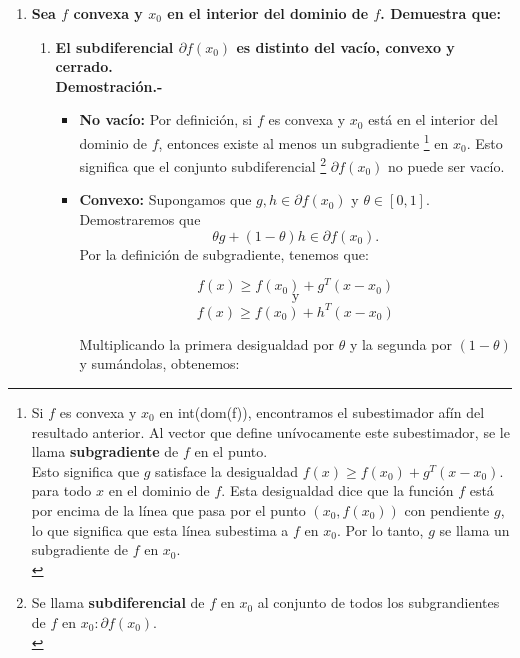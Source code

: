 \begin{enumerate}

    \item \textbf{\boldmath Sea $f$ convexa y $x_0$ en el interior del dominio de $f$. Demuestra que:}
	\begin{enumerate}[\bfseries (a)]
	    \item \textbf{\boldmath El subdiferencial $\partial f(x_0)$ es distinto del vacío, convexo y cerrado.}\\

		\textbf{Demostración.-}\; 

		\begin{itemize}

		    \item \textbf{No vacío:} Por definición, si $f$ es convexa y $x_0$ está en el interior del dominio de $f$, entonces existe al menos un subgradiente
		    \footnote{
			Si $f$ es convexa y $x_0$ en int(dom(f)), encontramos el subestimador afín del resultado anterior. Al vector que define unívocamente este subestimador, se le llama \textbf{subgradiente} de $f$ en el punto.\\
			Esto significa que $g$ satisface la desigualdad $f(x) \geq f(x_0) + g^T (x-x_0).$ para todo $x$ en el dominio de $f$. Esta desigualdad dice que la función $f$ está por encima de la línea que pasa por el punto $(x_0, f(x_0))$ con pendiente $g$, lo que significa que esta línea subestima a $f$ en $x_0$. Por lo tanto, $g$ se llama un subgradiente de $f$ en $x_0$.\\
		    \label{subgradiente}}
			en $x_0$. Esto significa que el conjunto subdiferencial
		    \footnote{	
			Se llama \textbf{subdiferencial} de $f$ en $x_0$ al conjunto de todos los subgrandientes de $f$ en $x_0: \partial f(x_0)$.\\
		    \label{subdiferencial}}
			$\partial f(x_0)$ no puede ser vacío.\\

		    \item \textbf{Convexo:} Supongamos que $g,h \in \partial f(x_0)$ y $\theta \in [0,1]$. Demostraremos que 
			$$\theta g + (1-\theta)h \in \partial f(x_0).$$
			Por la definición de subgradiente, tenemos que:

			$$f(x) \geq f(x_0) + g^T (x-x_0)$$
			$$\text{y}$$
			$$f(x) \geq f(x_0) + h^T (x-x_0)$$
    
		    Multiplicando la primera desigualdad por $\theta$ y la segunda por $(1-\theta)$ y sumándolas, obtenemos:
		

\end{itemize}
\end{enumerate}
\end{enumerate}
